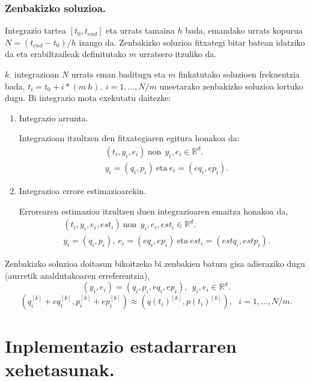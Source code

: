 \subsubsection*{Zenbakizko soluzioa.}  

Integrazio tartea $[t_0,t_{end}]$ eta urrats tamaina $h$ bada, emandako urrats kopurua $N=(t_{end}-t_0)/h$ izango da. Zenbakizko soluzioa fitxategi bitar batean idatziko da eta erabiltzaileak definitutako $m$ urratsero itzuliko da. 

$k$. integrazioan $N$ urrats eman baditugu eta $m$ finkatutako soluzioen frekuentzia bada, $t_i=t_0+i*(m \ h), \ i=1,\dots,N/m$ uneetarako zenbakizko soluzioa lortuko dugu. Bi integrazio mota exekutatu daitezke:

\begin{enumerate}
\item Integrazio arrunta.

Integrazioan itzultzen den fitxategiaren egitura honakoa da:
\begin{align*}
& (t_i,y_i,e_i) \ \text{non} \ \ y_i,e_i \in \mathbb{R}^d.\\
& y_i=(q_i,p_i) \ \text{eta} \ e_i=(eq_i,ep_i).
\end{align*}

\item Integrazioa errore estimazioarekin.

Errorearen estimazioa itzultzen duen integrazioaren emaitza honakoa da,
\begin{align*}
& (t_i,y_i,e_i,est_i) \ \text{non} \ \ y_i,e_i,est_i \in \mathbb{R}^d.\\
&  y_i=(q_i,p_i), \ e_i=(eq_i,ep_i) \ \text{eta} \ est_i=(estq_i,estp_i).
\end{align*}

\end{enumerate}

 Zenbakizko soluzioa doitasun bikoitzeko bi zenbakien batura gisa adieraziko dugu (aurretik azaldutakoaren erreferentzia),
\begin{equation*}
(y_i,e_i)=(q_i,p_i,eq_i,ep_i), \ \ y_i,e_i \in \mathbb{R}^d.
\end{equation*}
\begin{equation*}
(q_i^{[k]}+eq_i^{[k]},p_i^{[k]}+ep_i^{[k]})\approx(q(t_i)^{[k]},p(t_i)^{[k]}), \ \ \ i=1,\dots,N/m.
\end{equation*}


\clearpage

\section{Inplementazio estadarraren xehetasunak.}

